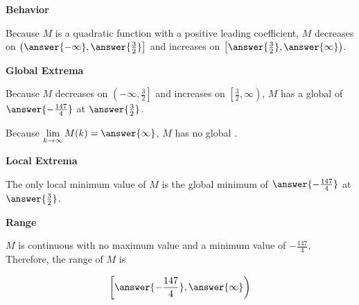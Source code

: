 \documentclass{ximera}
\begin{document}
\begin{exercise}
\begin{question}
\end{question}




\begin{question}  \textbf{\textcolor{blue!55!black}{Behavior}}



Because $M$ is a quadratic function with a positive leading coefficient, $M$ decreases on $\left( \answer{-\infty}, \answer{\frac{3}{2}} \right]$ and increases on $\left[ \answer{\frac{3}{2}}, \answer{\infty} \right)$. 

\end{question}









\begin{question}  \textbf{\textcolor{blue!55!black}{Global Extrema}}

Because $M$ decreases on $\left( -\infty, \frac{3}{2} \right]$ and increases on $\left[ \frac{3}{2}, \infty \right)$, $M$ has a global   of $\answer{-\frac{147}{4}}$ at $\answer{\frac{3}{2}}$.



Because $\lim\limits_{k \to \infty} M(k) = \answer{\infty}$, $M$ has no global .

\end{question}












\begin{question}  \textbf{\textcolor{blue!55!black}{Local Extrema}}

The only local minimum value of $M$ is the global minimum of $\answer{-\frac{147}{4}}$ at $\answer{\frac{3}{2}}$.

\end{question}







\begin{question}  \textbf{\textcolor{blue!55!black}{Range}}

$M$ is continuous with no maximum value and a minimum value of $-\frac{147}{4}$.  Therefore, the range of $M$ is

\[
\left[ \answer{-\frac{147}{4}},  \answer{\infty} \right)
\]

\end{question}


\end{exercise}
\end{document}
